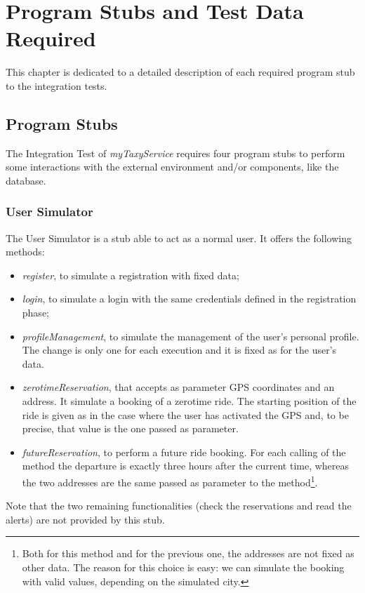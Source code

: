 \documentclass[\mainpath/main]{subfiles}
\begin{document}
\chapter{Program Stubs and Test Data Required} %
\label{ProgramStubsAndTestDataRequired}

\setmyfancystyle

This chapter is dedicated to a detailed description of each required program stub to the integration tests.\\

\section{Program Stubs}
\label{ProgramStubsAndTestDataRequired:ProgramStubs}

The Integration Test of \textit{myTaxyService} requires four program stubs to perform some interactions with the external environment and/or components, like the database.

\subsection{User Simulator}
\label{ProgramStubsAndTestDataRequired:ProgramStubs:UserSimulator}

The User Simulator is a stub able to act as a normal user. It offers the following methods:
\begin{itemize}
	\item \textit{register}, to simulate a registration with fixed data;
	\item \textit{login}, to simulate a login with the same credentials defined in the registration phase;
	\item \textit{profileManagement}, to simulate the management of the user's personal profile. The change is only one for each execution and it is fixed as for the user's data.
	\item \textit{zerotimeReservation}, that accepts as parameter GPS coordinates and an address. It simulate a booking of a zerotime ride. The starting position of the ride is given as in the case where the user has activated the GPS and, to be precise, that value is the one passed as parameter. 
	\item \textit{futureReservation}, to perform a future ride booking. For each calling of the method the departure is exactly three hours after the current time, whereas the two addresses are the same passed as parameter to the method\footnote{Both for this method and for the previous one, the addresses are not fixed as other data. The reason for this choice is easy: we can simulate the booking with valid values, depending on the simulated city.}.\\
\end{itemize}
Note that the two remaining functionalities (check the reservations and read the alerts) are not provided by this stub.
\end{document}
